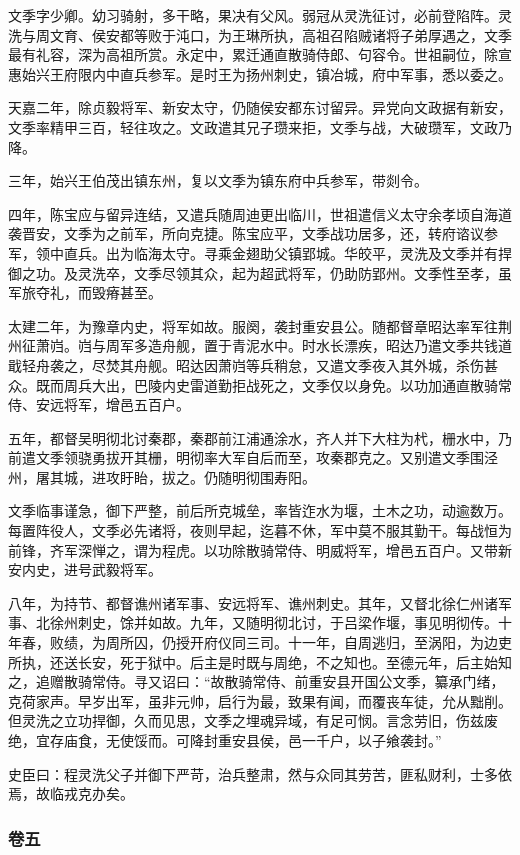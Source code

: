 \documentclass[]{article}
\begin{document}
文季字少卿。幼习骑射，多干略，果决有父风。弱冠从灵洗征讨，必前登陷阵。灵洗与周文育、侯安都等败于沌口，为王琳所执，高祖召陷贼诸将子弟厚遇之，文季最有礼容，深为高祖所赏。永定中，累迁通直散骑侍郎、句容令。世祖嗣位，除宣惠始兴王府限内中直兵参军。是时王为扬州刺史，镇冶城，府中军事，悉以委之。

天嘉二年，除贞毅将军、新安太守，仍随侯安都东讨留异。异党向文政据有新安，文季率精甲三百，轻往攻之。文政遣其兄子瓒来拒，文季与战，大破瓒军，文政乃降。

三年，始兴王伯茂出镇东州，复以文季为镇东府中兵参军，带剡令。

四年，陈宝应与留异连结，又遣兵随周迪更出临川，世祖遣信义太守余孝顷自海道袭晋安，文季为之前军，所向克捷。陈宝应平，文季战功居多，还，转府谘议参军，领中直兵。出为临海太守。寻乘金翅助父镇郢城。华皎平，灵洗及文季并有捍御之功。及灵洗卒，文季尽领其众，起为超武将军，仍助防郢州。文季性至孝，虽军旅夺礼，而毁瘠甚至。

太建二年，为豫章内史，将军如故。服阕，袭封重安县公。随都督章昭达率军往荆州征萧岿。岿与周军多造舟舰，置于青泥水中。时水长漂疾，昭达乃遣文季共钱道戢轻舟袭之，尽焚其舟舰。昭达因萧岿等兵稍怠，又遣文季夜入其外城，杀伤甚众。既而周兵大出，巴陵内史雷道勤拒战死之，文季仅以身免。以功加通直散骑常侍、安远将军，增邑五百户。

五年，都督吴明彻北讨秦郡，秦郡前江浦通涂水，齐人并下大柱为杙，栅水中，乃前遣文季领骁勇拔开其栅，明彻率大军自后而至，攻秦郡克之。又别遣文季围泾州，屠其城，进攻盱眙，拔之。仍随明彻围寿阳。

文季临事谨急，御下严整，前后所克城垒，率皆迮水为堰，土木之功，动逾数万。每置阵役人，文季必先诸将，夜则早起，迄暮不休，军中莫不服其勤干。每战恒为前锋，齐军深惮之，谓为程虎。以功除散骑常侍、明威将军，增邑五百户。又带新安内史，进号武毅将军。

八年，为持节、都督谯州诸军事、安远将军、谯州刺史。其年，又督北徐仁州诸军事、北徐州刺史，馀并如故。九年，又随明彻北讨，于吕梁作堰，事见明彻传。十年春，败绩，为周所囚，仍授开府仪同三司。十一年，自周逃归，至涡阳，为边吏所执，还送长安，死于狱中。后主是时既与周绝，不之知也。至德元年，后主始知之，追赠散骑常侍。寻又诏曰：``故散骑常侍、前重安县开国公文季，纂承门绪，克荷家声。早岁出军，虽非元帅，启行为最，致果有闻，而覆丧车徒，允从黜削。但灵洗之立功捍御，久而见思，文季之埋魂异域，有足可悯。言念劳旧，伤兹废绝，宜存庙食，无使馁而。可降封重安县侯，邑一千户，以子飨袭封。''

史臣曰：程灵洗父子并御下严苛，治兵整肃，然与众同其劳苦，匪私财利，士多依焉，故临戎克办矣。

\hypertarget{header-n4395}{%
\subsubsection{卷五}\label{header-n4395}}
\end{document}
